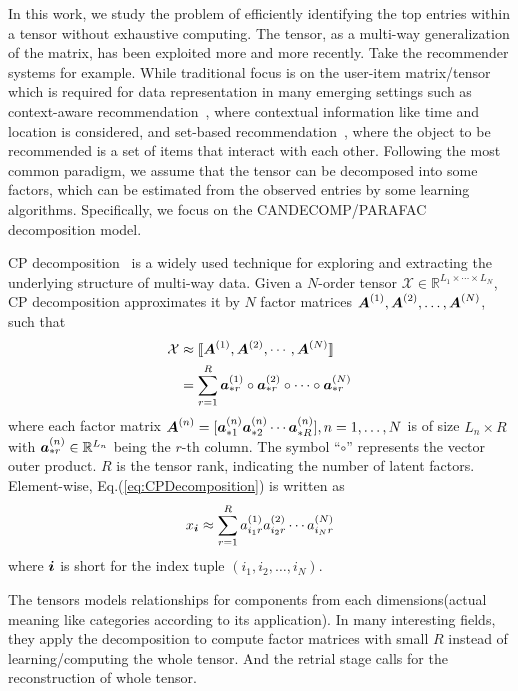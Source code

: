 \documentclass[10pt,journal,compsoc]{IEEEtran}
\newcommand{\Sca}[3]{{#1}^{(#2)}_{i_#2#3}}%
\newcommand{\anr}[2]{\Sca{a}{#1}{#2}}
\newcommand{\T}[1]{\mathcal{#1}}
\newcommand{\KT}[1]{\llbracket #1 \rrbracket}
\newcommand{\V}[1]{{\boldsymbol{{\MakeLowercase{#1}}}}}
\newcommand{\ColVec}[3]{\V{#1}^{(#2)}_{#3}}
\newcommand{\ColVecA}[1]{\V{a}^{(#1)}_{*r}}
\newcommand{\M}[1]{{\boldsymbol{{\MakeUppercase{#1}}}}}
\newcommand{\FacMat}[2]{\M{#1}^{(#2)}}
\newcommand{\Eqn}[1]{Eq.(\ref{eq:#1})}
\begin{document}
In this work, we study the problem of efficiently identifying the top entries within a tensor without exhaustive computing. The tensor, as a multi-way generalization of the matrix, has been exploited more and more recently.
Take the recommender systems for example.
While traditional focus is on the user-item matrix/tensor
which is required for data representation in many emerging settings
such as context-aware recommendation~\cite{},
where contextual information like time and location is considered,
and set-based recommendation~\cite{HuYiLa15,Rendle_PITF,KoYe09},
where the object to be recommended is a set of items that interact with each other.
Following the most common paradigm, we assume that the tensor can be decomposed into some factors,
which can be estimated from the observed entries by some learning algorithms.
Specifically, we focus on the CANDECOMP/PARAFAC decomposition model.

CP decomposition~\cite{KoBa09} is a widely used technique for exploring and
extracting the underlying structure of multi-way data.
Given a $N$-order tensor $\T{X}\in\mathbb{R}^{L_1\times \cdots\times L_N}$,
CP decomposition approximates it by $N$ factor matrices $\FacMat{A}{1},\FacMat{A}{2},\ldots,\FacMat{A}{N}$,
such that
\begin{align}
\label{eq:CPDecomposition}
\T{X}&\approx\KT{\FacMat{A}{1},\FacMat{A}{2},\cdots,\FacMat{A}{N}} \\ \notag
&=\sum_{r=1}^R\ColVecA{1}\circ\ColVecA{2}\circ\cdots\circ\ColVecA{N}
\end{align}
where each factor matrix
$\FacMat{A}{n}=[\ColVec{a}{n}{*1}\ColVec{a}{n}{*2}\cdots\ColVec{a}{n}{*R}], n=1,\ldots,N$
is of size $L_n\times R$ with $\ColVec{a}{n}{*r}\in\mathbb{R}^{L_n}$
being the $r$-th column.
The symbol ``$\circ$'' represents the vector outer product.
$R$ is the tensor rank, indicating the number of latent factors.
Element-wise, \Eqn{CPDecomposition} is written as
\begin{align}
\label{eq:CPValue}
x_\V{i} \approx \sum_{r=1}^{R}\anr{1}{r}\anr{2}{r}\cdots\anr{N}{r}
\end{align}
where $\V{i}$ is short for the index tuple $(i_1,i_2,\ldots,i_N)$.

The tensors models relationships for components from each dimensions(actual meaning like categories according to its application). In many interesting fields, they apply the decomposition to compute factor matrices with small $R$ instead of learning/computing the whole tensor. And the retrial stage calls for the reconstruction of whole tensor.
\end{document}
